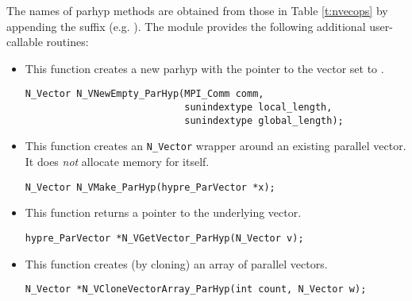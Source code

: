 The names of parhyp methods are obtained from those in Table \ref{t:nvecops}
by appending the suffix  (e.g. ).
The module {\nvecph} provides the following additional user-callable routines:
\begin{itemize}


\item {}
 
  This function creates a new parhyp  with the pointer to the {\hypre} 
  vector set to .


\begin{verbatim}
N_Vector N_VNewEmpty_ParHyp(MPI_Comm comm, 
                            sunindextype local_length, 
                            sunindextype global_length);
\end{verbatim}

  

\item {}
  
  This function creates an \verb|N_Vector| wrapper around an existing
  {\hypre} parallel vector. It does {\em not} allocate memory for  
  itself.  

\begin{verbatim}
N_Vector N_VMake_ParHyp(hypre_ParVector *x);
\end{verbatim}


\item {}
  
  This function returns a pointer to the underlying {\hypre} vector.
 
    
  \verb|hypre_ParVector *N_VGetVector_ParHyp(N_Vector v);|



\item {}
 
  This function creates (by cloning) an array of  parallel vectors.
 
\begin{verbatim}
N_Vector *N_VCloneVectorArray_ParHyp(int count, N_Vector w);
\end{verbatim}



\end{itemize}
